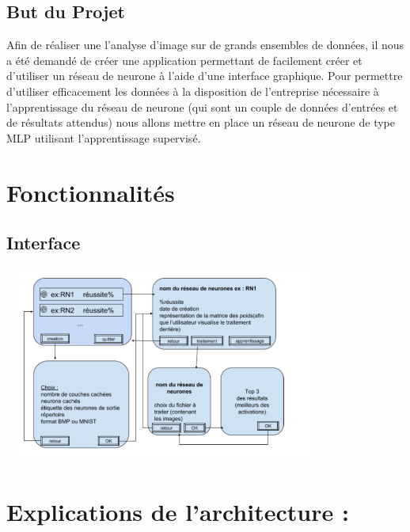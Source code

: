 \documentclass{article}
\begin{document}
	\subsection{But du Projet}
		Afin de réaliser une l'analyse d'image sur de grands ensembles de données, il nous a été demandé de créer une application permettant de facilement créer et d'utiliser un réseau de neurone à l'aide d'une interface graphique. Pour permettre d'utiliser efficacement les données à la disposition de l'entreprise nécessaire à l'apprentissage du réseau de neurone (qui sont un couple de données d'entrées et de résultats attendus) nous allons mettre en place un réseau de neurone de type MLP utilisant l'apprentissage supervisé.

\section{Fonctionnalités}
\subsection{Interface}
			\begin{center} 
				\includegraphics[height=244, width=400]{interface.png}
			\end{center}

\section{Explications de l'architecture :}
\end{document}
